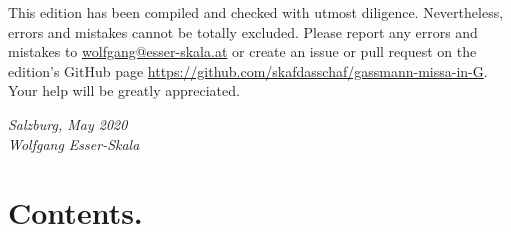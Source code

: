 \documentclass[parskip=full]{scrreprt}
\newif\iftemplate\templatetrue
\begin{document}
This edition has been compiled and checked with utmost diligence. Nevertheless, errors and mistakes cannot be totally excluded. Please report any errors and mistakes to \url{wolfgang@esser-skala.at} or create an issue or pull request on the edition’s GitHub page \url{https://github.com/skafdasschaf/gassmann-missa-in-G}. Your help will be greatly appreciated.

\bigskip
\textit{Salzburg, May 2020\\
Wolfgang Esser-Skala}

\cleardoublepage
\chapter*{Contents.}


\cleardoublepage
\fi

\iftemplate

\fi
\end{document}
